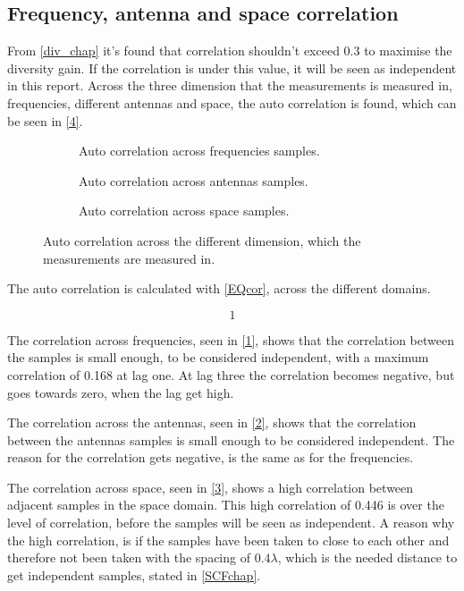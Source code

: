 \subsection{Frequency, antenna and space correlation}
From \autoref{div_chap} it's found that correlation shouldn't exceed 0.3 to maximise the diversity gain. If the correlation is under this value, it will be seen as independent in this report. Across the three dimension that the measurements is measured in, frequencies, different antennas and space, the auto correlation is found, which can be seen in \autoref{4}.

\begin{figure}[H]
\captionsetup{belowskip=0em}
\begin{subfigure}[b]{0.326\textwidth}

\caption{Auto correlation across frequencies samples.}
\label{1}
\end{subfigure}
\begin{subfigure}[b]{0.326\textwidth}

\caption{Auto correlation across antennas samples.}
\label{2}
\end{subfigure}
\begin{subfigure}[b]{0.326\textwidth}

\caption{Auto correlation across space samples.}
\label{3}
\end{subfigure}
\captionsetup{belowskip=-1.5em}
\caption{Auto correlation across the different dimension, which the measurements are measured in.}
\label{4}
\end{figure}

The auto correlation is calculated with \autoref{EQcor}, across the different domains.

\begin{equation}
1
\label{EQcor}
\end{equation}

The correlation across frequencies, seen in \autoref{1}, shows that the correlation between the samples is small enough, to be considered independent, with a maximum correlation of 0.168 at lag one. At lag three the correlation becomes negative, but goes towards zero, when the lag get high. 

The correlation across the antennas, seen in \autoref{2}, shows that the correlation between the antennas samples is small enough to be considered independent. The reason for the correlation gets negative, is the same as for the frequencies.

The correlation across space, seen in \autoref{3}, shows a high correlation between adjacent samples in the space domain. This high correlation of 0.446 is over the level of correlation, before the samples will be seen as independent. A reason why the high correlation, is if the samples have been taken to close to each other and therefore not been taken with the spacing of $0.4 \lambda$, which is the needed distance to get independent samples, stated in \autoref{SCFchap}.


